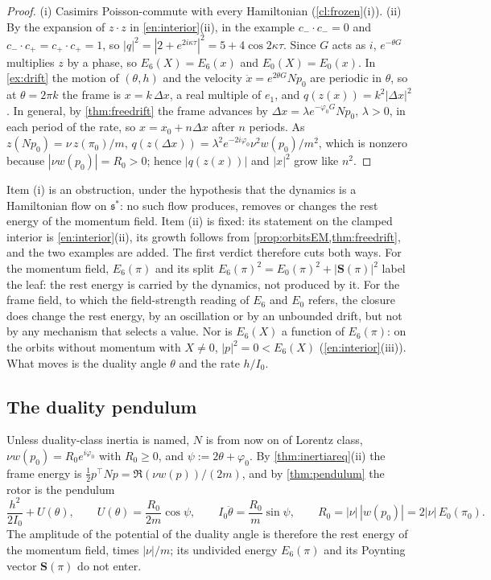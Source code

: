 \begin{proof}
(i) Casimirs Poisson-commute with every Hamiltonian (\cref{cl:frozen}(i)). (ii) By the expansion of $z\cdot z$ in \cref{en:interior}(ii), in the example $c_-\cdot c_-=0$ and $c_-\cdot c_+=c_+\cdot c_+=1$, so $|q|^2=|2+e^{2i\kappa\tau}|^2=5+4\cos2\kappa\tau$. Since $G$ acts as $i$,
$e^{-\theta G}$ multiplies $z$ by a phase, so $E_6(X)=E_6(x)$ and $E_0(X)=E_0(x)$. In \cref{ex:drift} the motion of $(\theta,h)$ and the velocity
$\dot x=e^{2\theta G}Np_0$ are periodic in $\theta$, so at $\theta=2\pi k$ the frame is $x=k\,\Delta x$, a real multiple of $e_1$, and
$q(z(x))=k^2|\Delta x|^2$. In general, by \cref{thm:freedrift} the frame advances by $\Delta x=\lambda e^{-\varphi_0G}Np_0$, $\lambda>0$, in each
period of the rate, so $x=x_0+n\Delta x$ after $n$ periods. As $z(Np_0)=\nu\,z(\pi_0)/m$, $q(z(\Delta x))=\lambda^2e^{-2i\varphi_0}\nu^2w(p_0)/m^2$,
which is nonzero because $|\nu w(p_0)|=R_0>0$; hence $|q(z(x))|$ and $|x|^2$ grow like $n^2$.
\end{proof}

Item (i) is an obstruction, under the hypothesis that the dynamics is a Hamiltonian flow on $\mathfrak s^*$: no such flow produces, removes or
changes the rest energy of the momentum field. Item (ii) is fixed: its statement on the clamped interior is \cref{en:interior}(ii), its growth follows from \cref{prop:orbitsEM,thm:freedrift}, and the two examples are added. The first verdict therefore cuts both
ways. For the momentum field, $E_6(\pi)$ and its split $E_6(\pi)^2=E_0(\pi)^2+|\mathbf S(\pi)|^2$ label the leaf: the rest energy is carried by the
dynamics, not produced by it. For the frame field, to which the field-strength reading of $E_6$ and $E_0$ refers, the closure does change the rest
energy, by an oscillation or by an unbounded drift, but not by any mechanism that selects a value. Nor is $E_6(X)$ a function of
$E_6(\pi)$: on the orbits without momentum with $X\neq0$, $|p|^2=0<E_6(X)$ (\cref{en:interior}(iii)). What moves is the duality angle $\theta$
and the rate $h/I_0$.

\subsection{The duality pendulum}
\label{sec:restpendulum}

Unless duality-class inertia is named, $N$ is from now on of Lorentz class, $\nu w(p_0)=R_0e^{i\varphi_0}$ with $R_0\ge0$, and $\psi:=2\theta+\varphi_0$. By \cref{thm:inertiareq}(ii) the
frame energy is $\tfrac12p^{\!\top}Np=\Re(\nu w(p))/(2m)$, and by \cref{thm:pendulum} the rotor is the pendulum
\[
\frac{h^2}{2I_0}+U(\theta),\qquad U(\theta)=\frac{R_0}{2m}\cos\psi,\qquad I_0\ddot\theta=\frac{R_0}m\sin\psi,\qquad
R_0=|\nu|\,|w(p_0)|=2|\nu|\,E_0(\pi_0).
\]
The amplitude of the potential of the duality angle is therefore the rest energy of the momentum field, times $|\nu|/m$; its undivided energy
$E_6(\pi)$ and its Poynting vector $\mathbf S(\pi)$ do not enter.

